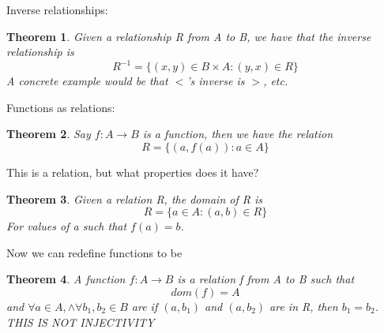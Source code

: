 \documentclass{article}
\newtheorem{theorem}{Theorem}[section]
\begin{document}
Inverse relationships:

\begin{theorem}
    Given a relationship R from A to B, we have that the inverse relationship is 
    \begin{equation}
        R^{-1}=\{(x,y) \in B \times A: (y,x) \in R\}
    \end{equation}
    A concrete example would be that $<$'s inverse is $>$, etc. 
\end{theorem}

Functions as relations:

\begin{theorem}
    Say $f: A \rightarrow B$ is a function, then we have the relation
    \begin{equation}
        R = \{(a,f(a)): a \in A\}
    \end{equation}
\end{theorem}

This is a relation, but what properties does it have?

\begin{theorem}
    Given a relation R, the domain of R is 
    \begin{equation}
        R = \{a \in A: (a,b) \in R\}
    \end{equation}
    For values of a such that $f(a) = b$.
\end{theorem}

Now we can redefine functions to be 

\begin{theorem}
    A function $f: A \rightarrow B$ is a relation f from A to B such that 
    \begin{equation}
        dom(f) = A
    \end{equation}
    and $\forall a \in A, \land \forall b_1,b_2 \in B$ are if $(a,b_1)$ and $(a,b_2)$ are in R, then $b_1 = b_2$. 
    THIS IS NOT INJECTIVITY
\end{theorem}
\end{document}
